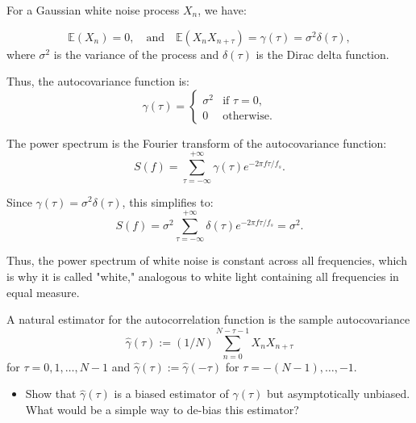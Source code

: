 \documentclass[11pt]{article}
\begin{document}
\begin{solution} %

For a Gaussian white noise process \(X_n\), we have:

\[
\mathbb{E}(X_n) = 0, \quad \text{and} \quad \mathbb{E}(X_n X_{n+\tau}) = \gamma(\tau) = \sigma^2 \delta(\tau),
\]
where \(\sigma^2\) is the variance of the process and \(\delta(\tau)\) is the Dirac delta function.

Thus, the autocovariance function is:
\[
\gamma(\tau) = \begin{cases} 
\sigma^2 & \text{if } \tau = 0, \\
0 & \text{otherwise}.
\end{cases}
\]

The power spectrum is the Fourier transform of the autocovariance function:
\[
S(f) = \sum_{\tau=-\infty}^{+\infty} \gamma(\tau) e^{-2\pi f \tau / f_s}.
\]

Since \(\gamma(\tau) = \sigma^2 \delta(\tau)\), this simplifies to:
\[
S(f) = \sigma^2 \sum_{\tau=-\infty}^{+\infty} \delta(\tau) e^{-2\pi f \tau / f_s} = \sigma^2.
\]

Thus, the power spectrum of white noise is constant across all frequencies, which is why it is called "white," analogous to white light containing all frequencies in equal measure.

\end{solution} %


\begin{exercise}
A natural estimator for the autocorrelation function is the sample autocovariance
\begin{equation}
    \hat{\gamma}(\tau) := (1/N) \sum_{n=0}^{N-\tau-1} X_n X_{n+\tau}
\end{equation}
for $\tau=0,1,\dots,N-1$ and $\hat{\gamma}(\tau):=\hat{\gamma}(-\tau)$ for $\tau=-(N-1),\dots,-1$.
\begin{itemize}
    \item Show that $\hat{\gamma}(\tau)$ is a biased estimator of $\gamma(\tau)$ but asymptotically unbiased.
    What would be a simple way to de-bias this estimator?
\end{itemize}

\end{exercise}
\end{document}
